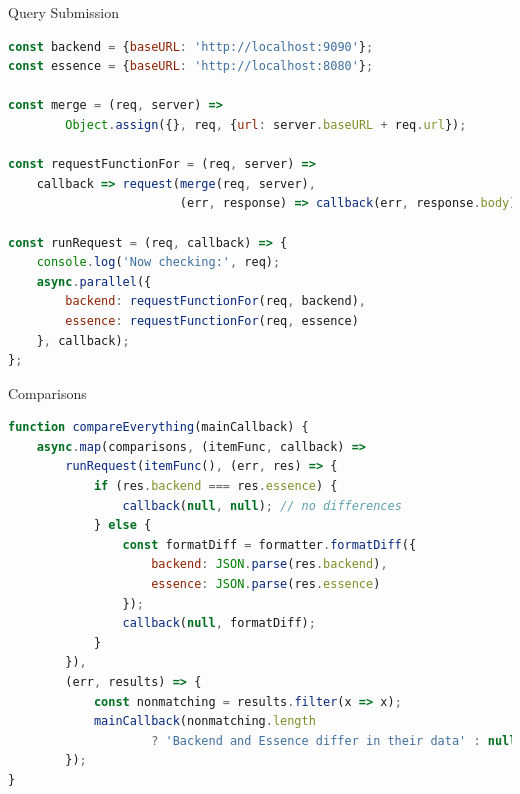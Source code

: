 \begin{frame}[fragile]{Query Submission}

\begin{lstlisting}[language=JavaScript]
const backend = {baseURL: 'http://localhost:9090'};
const essence = {baseURL: 'http://localhost:8080'};

const merge = (req, server) => 
        Object.assign({}, req, {url: server.baseURL + req.url});

const requestFunctionFor = (req, server) =>
    callback => request(merge(req, server), 
                        (err, response) => callback(err, response.body));

const runRequest = (req, callback) => {
    console.log('Now checking:', req);
    async.parallel({
        backend: requestFunctionFor(req, backend),
        essence: requestFunctionFor(req, essence)
    }, callback);
};
\end{lstlisting}

\end{frame}

\begin{frame}[fragile]{Comparisons}

\begin{lstlisting}[language=JavaScript]
function compareEverything(mainCallback) {
    async.map(comparisons, (itemFunc, callback) => 
        runRequest(itemFunc(), (err, res) => {
            if (res.backend === res.essence) {
                callback(null, null); // no differences
            } else {
                const formatDiff = formatter.formatDiff({
                    backend: JSON.parse(res.backend),
                    essence: JSON.parse(res.essence)
                });
                callback(null, formatDiff);
            }
        }),
        (err, results) => {
            const nonmatching = results.filter(x => x);
            mainCallback(nonmatching.length
                    ? 'Backend and Essence differ in their data' : null);
        });
}
\end{lstlisting}

\end{frame}



